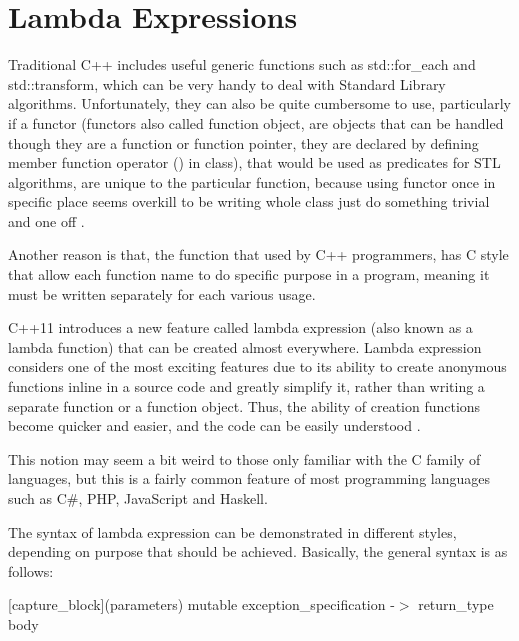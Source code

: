 \documentclass[11pt]{report}
\begin{document}
\section{Lambda Expressions}
\label{section: Lambda Expressions}
Traditional C++ includes useful generic functions such as std::for\_each and std::transform, which can be very handy to deal with Standard Library algorithms.  Unfortunately, they can also be quite cumbersome to use, particularly if a functor (functors also called function object, are objects that can be handled though they are a function or function pointer, they are declared by defining member function operator () in class), that would be used as predicates for STL algorithms, are unique to the particular function, because using functor once in specific place seems overkill to be writing whole class just do something trivial and one off \cite{Allain:2011:FutureCpp}. 


Another reason is that, the function that used by C++ programmers, has C style that  allow each function name to do specific purpose in a program, meaning it must be written separately for each various usage.


C++11 introduces a new feature called lambda expression (also known as a lambda function) that can be created almost everywhere. Lambda expression considers one of the most exciting features due to its ability to create anonymous functions inline in a source code and greatly simplify it, rather than writing a separate function or a function object.  Thus, the ability of creation functions become quicker and easier, and the code can be easily understood \cite{Gregorie:professionalcpp}.


This notion may seem a bit weird to those only familiar with the C family of languages, but this is a fairly common feature of most programming languages such as C\#, PHP, JavaScript and Haskell.  


The syntax of lambda expression can be demonstrated in different styles, depending on purpose that should be achieved. Basically, the general syntax is as follows:
\begin{center}
[capture\_block](parameters) mutable exception\_specification -$>$ return\_type {body}
\end{center}
\end{document}
